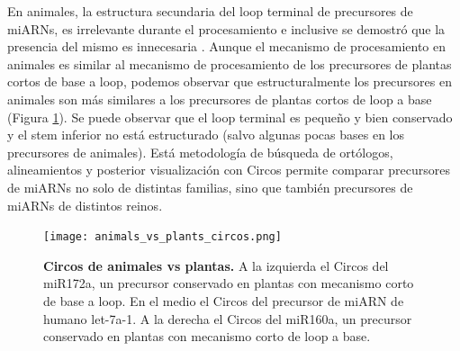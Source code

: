 En animales, la estructura secundaria del loop terminal de precursores de miARNs, es irrelevante durante el procesamiento e inclusive se demostró que la presencia del mismo es innecesaria \citep{pmid16751099}.
Aunque el mecanismo de procesamiento en animales es similar al mecanismo de procesamiento de los precursores de plantas cortos de base a loop, podemos observar que estructuralmente los precursores en animales son más similares a los precursores de plantas cortos de loop a base (Figura \ref{fig:animals_vs_plants_circos}).
Se puede observar que el loop terminal es pequeño y bien conservado y el stem inferior no está estructurado (salvo algunas pocas bases en los precursores de animales).
Está metodología de búsqueda de ortólogos, alineamientos y posterior visualización con Circos permite comparar precursores de miARNs no solo de distintas familias, sino que también precursores de miARNs de distintos reinos.
\begin{landscape}                                                                      
\begin{figure}[htbp!] 
        \centering    
        \texttt{[image: animals\_vs\_plants\_circos.png]}
        \caption[Circos de animales vs plantas]{
        \textbf{Circos de animales vs plantas.}
		A la izquierda el Circos del miR172a, un precursor conservado en plantas con mecanismo corto de base a loop.
		En el medio el Circos del precursor de miARN de humano let-7a-1.
		A la derecha el Circos del miR160a, un precursor conservado en plantas con mecanismo corto de loop a base.
        }
	 \label{fig:animals_vs_plants_circos}
    \end{figure}
\end{landscape}



